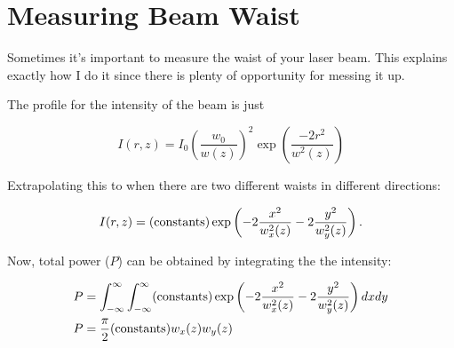 




%

\chapter{Measuring Beam Waist}
\label{app:BelongInApp}

Sometimes it's important to measure the waist of your laser beam. This explains exactly how I do it since there is plenty of opportunity for messing it up. 
  
The profile for the intensity of the beam is just 

\begin{equation} \label{electricFieldExplicitForm}
I(r,z)=I_0\left(\frac{w_0}{w(z)}\right)^2 \exp \left(\frac{-2 r^2}{w^2(z)}\right)
\end{equation}

Extrapolating this to when there are two different waists in different directions: 

\begin{equation}
I(r,z)= ({\rm constants})\exp \left(-2\frac{x^2}{w_x^2(z)}-2\frac{y^2}{w_y^2(z)}\right) . 
\end{equation}

Now, total power ($P$) can be obtained by integrating the the intensity: 

\begin{align}
P&=\int_{-\infty}^{\infty}\int_{-\infty}^{\infty} ({\rm constants}) \exp \left(-2\frac{x^2}{w_x^2(z)}-2\frac{y^2}{w_y^2(z)}\right) dx dy\\
P&=\frac{\pi}{2} ({\rm constants}) w_x(z) w_y(z)
\end{align}

